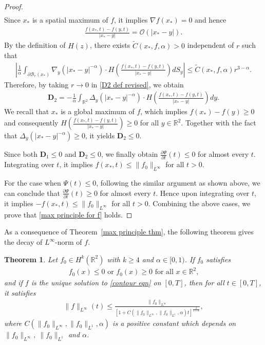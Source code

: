 \documentclass[reqno]{amsart}%
\newtheorem{thm}{Theorem}[section]
\theoremstyle{definition}
\theoremstyle{remark}
\numberwithin{equation}{section}
\newcommand{\0}{\mathbf{0}}
\newcommand{\1}{\mathbf{1}}
\newcommand{\R}{\mathbb R}
\numberwithin{equation}{section}
\numberwithin{theorem}{section}
\numberwithin{figure}{section}
\begin{document}
\begin{proof}
{\begin{align*}
\end{align*}
Since $x_*$ is a spatial maximum of $f$, it implies $\nabla f(x_*) = 0$ and hence
\begin{align*}
\frac{f{(x_*,t)} - f{(y,t)}}{|x_* - y|} =\mathcal{O}(|x_* - y|).
\end{align*}
By the definition of $H(z)$, there exists $\tilde{C}(x_*,f,\alpha)>0$ independent of $r$ such that
\begin{align*}
\left|\frac{1}{\alpha} \int_{\partial\mathcal{B}_r(x_{*})} \nabla_y \left( |x_* - y|^{-\alpha} \right) \cdot H \left( \frac{f{(x_*,t)} - f{(y,t)}}{|x_* - y|} \right) dS_y\right|\le \tilde{C}(x_*,f,\alpha)r^{3-\alpha}.
\end{align*}
Therefore, by taking $r\to0$ in \eqref{D2 def revised}, we obtain
\begin{align*}
\mathbf{D}_{2}=-\frac{1}{\alpha} \int_{\mathbb{R}^2} \Delta_y \left( |x_* - y|^{-\alpha} \right) \cdot H \left( \frac{f{(x_*,t)} - f{(y,t)}}{|x_* - y|} \right) dy.
\end{align*}
We recall that $x_*$ is a global maximum of $f$, which implies $f(x_*) - f(y) \ge 0$ and consequently 
$H \left( \frac{f{(x_*,t)} - f{(y,t)}}{|x_* - y|} \right) \ge 0$ for all $y\in\R^2$. Together with the fact that $\Delta_y \left( |x_* - y|^{-\alpha} \right)\ge0$, it yields $\mathbf{D}_{2}\le0$.

Since both $\mathbf{D}_1 \le 0$ and $\mathbf{D}_{2}\le0$, we finally obtain $\frac{\partial \Psi}{\partial t}(t)\le 0$ for almost every $t$. Integrating over $t$, it implies $f(x_*,t)\le\|f_0\|_{L^\infty}$ for all $t>0$.}

For the case when $\Psi(t)\le 0$, following the similar argument as shown above, we can conclude that $\frac{\partial \Psi}{\partial t}(t)\ge 0$ for almost every $t$. Hence upon integrating over $t$, it implies $-f(x_*,t)\le\|f_0\|_{L^\infty}$ for all $t>0$. Combining the above cases, we prove that \eqref{max principle for f} holds.
\end{proof}

As a consequence of Theorem~\ref{max principle thm}, the following theorem gives the decay of $L^\infty$-norm of $f$.

\begin{thm}\label{decay of f thm}
Let $f_0\in H^k(\R^2)$ with $k\ge4$ and $\alpha\in[0,1)$. If $f_0$ satisfies
\begin{align}\label{positivity assumption on f0}
\text{$f_0(x)\le0$ or $f_0(x)\ge0$ for all $x\in\R^2$,}
\end{align}
and if $f$ is the unique solution to \eqref{contour eqn} on $[0,T]$, then for all $t\in[0,T]$, it satisfies
\begin{align}\label{decay on f in L infty norm}
\|f\|_{L^\infty}(t)\le\frac{\|f_0\|_{L^\infty}}{[1+C(\|f_0\|_{L^\infty},\|f_0\|_{L^1},\alpha)t]^\frac{2}{1+\alpha}},
\end{align}
where $C(\|f_0\|_{L^\infty},\|f_0\|_{L^1},\alpha)$ is a positive constant which depends on $\|f_0\|_{L^\infty}$, $\|f_0\|_{L^1}$ and $\alpha$.
\end{thm}
\end{document}
